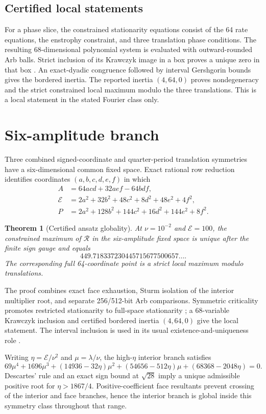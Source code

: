\documentclass[11pt]{article}
\newtheorem{theorem}{Theorem}[section]
\newcommand{\E}{\mathcal{E}}
\newcommand{\rate}{\mathcal{R}}
\begin{document}
\subsection{Certified local statements}
For a phase slice, the constrained stationarity equations consist of the 64
rate equations, the enstrophy constraint, and three translation phase
conditions. The resulting 68-dimensional polynomial system is evaluated with
outward-rounded Arb balls. Strict inclusion of its Krawczyk image in a box
proves a unique zero in that box \cite{Krawczyk1969}. An exact-dyadic
congruence followed by interval Gershgorin bounds gives the bordered inertia.
The reported inertia $(4,64,0)$ proves nondegeneracy and the strict constrained
local maximum modulo the three translations. This is a local statement in the
stated Fourier class only.

\section{Six-amplitude branch}
Three combined signed-coordinate and quarter-period translation symmetries
have a six-dimensional common fixed space.  Exact rational row reduction
identifies coordinates $(a,b,c,d,e,f)$ in which
\begin{align}
 A&=64acd+32aef-64bdf,\label{eq:sixA}\\
 \E&=2a^2+32b^2+48c^2+8d^2+48e^2+4f^2,\label{eq:sixE}\\
 P&=2a^2+128b^2+144c^2+16d^2+144e^2+8f^2.\label{eq:sixP}
\end{align}

\begin{theorem}[Certified ansatz globality]\label{thm:six}
At $\nu=10^{-2}$ and $\E=100$, the constrained maximum of $\rate$ in the
six-amplitude fixed space is unique after the finite sign gauge and equals
\[449.718337230445715677500657\ldots.\]
The corresponding full 64-coordinate point is a strict local maximum modulo
translations.
\end{theorem}

The proof combines exact face exhaustion, Sturm isolation of the interior
multiplier root, and separate 256/512-bit Arb comparisons.  Symmetric
criticality promotes restricted stationarity to full-space stationarity
\cite{Palais1979}; a 68-variable Krawczyk inclusion and certified bordered
inertia $(4,64,0)$ give the local statement.  The interval inclusion is used
in its usual existence-and-uniqueness role \cite{Krawczyk1969}.

Writing $\eta=\E/\nu^2$ and $\mu=\lambda/\nu$, the high-$\eta$ interior
branch satisfies
\begin{equation}\label{eq:quartic}
69\mu^4+1696\mu^3+(14936-32\eta)\mu^2
+(54656-512\eta)\mu+(68368-2048\eta)=0.
\end{equation}
Descartes' rule and an exact sign bound at $\sqrt{28}$ imply a unique
admissible positive root for $\eta>1867/4$.  Positive-coefficient face
resultants prevent crossing of the interior and face branches, hence the
interior branch is global inside this symmetry class throughout that range.
\end{document}
